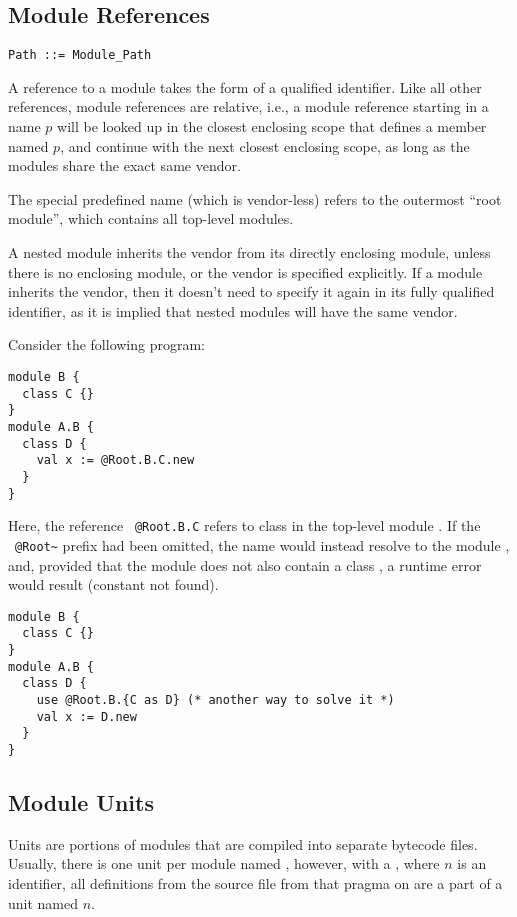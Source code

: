 \subsection{Module References}
\label{sec:module-refs}

\syntax\begin{lstlisting}
Path ::= Module_Path
\end{lstlisting}

A reference to a module takes the form of a qualified identifier. Like all other references, module references are relative, i.e., a module reference starting in a name $p$ will be looked up in the closest enclosing scope that defines a member named $p$, and continue with the next closest enclosing scope, as long as the modules share the exact same vendor. 

The special predefined name  (which is vendor-less) refers to the outermost ``root module'', which contains all top-level modules. 

A nested module inherits the vendor from its directly enclosing module, unless there is no enclosing module, or the vendor is specified explicitly. If a module inherits the vendor, then it doesn't need to specify it again in its fully qualified identifier, as it is implied that nested modules will have the same vendor. 

\example Consider the following program:
\begin{lstlisting}
module B {
  class C {}
}
module A.B {
  class D {
    val x := @Root.B.C.new
  }
}
\end{lstlisting}
Here, the reference ~\lstinline!@Root.B.C! refers to class  in the top-level module . If the ~\lstinline!@Root~! prefix had been omitted, the name  would instead resolve to the module , and, provided that the module does not also contain a class , a runtime error would result (constant not found). 
\begin{lstlisting}
module B {
  class C {}
}
module A.B {
  class D {
    use @Root.B.{C as D} (* another way to solve it *)
    val x := D.new
  }
}
\end{lstlisting}





\subsection{Module Units}
\label{sec:module-units}

Units are portions of modules that are compiled into separate bytecode files. Usually, there is one unit per module named , however, with a , where $n$ is an identifier, all definitions from the source file from that pragma on are a part of a unit named $n$. 

